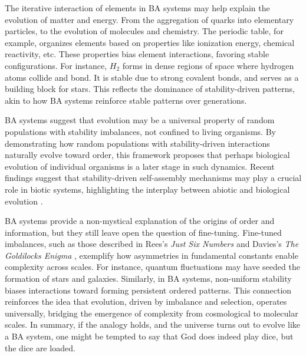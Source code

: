 \documentclass[entropy,article,submit,pdftex,moreauthors]{Definitions/mdpi}
\begin{document}
The iterative interaction of elements in BA systems may help explain the evolution of matter and energy. From the aggregation of quarks into elementary particles, to the evolution of molecules and chemistry. The periodic table, for example, organizes elements based on properties like ionization energy, chemical reactivity, etc. These properties bias element interactions, favoring stable configurations. For instance, \( H_2 \) forms in dense regions of space where hydrogen atoms collide and bond. It is stable due to strong covalent bonds, and serves as a building block for stars. This reflects the dominance of stability-driven patterns, akin to how BA systems reinforce stable patterns over generations. 

BA systems suggest that evolution may be a universal property of random populations with stability imbalances, not confined to living organisms. By demonstrating how random populations with stability-driven interactions naturally evolve toward order, this framework proposes that perhaps biological evolution of individual organisms is a later stage in such dynamics. Recent findings suggest that stability-driven self-assembly mechanisms may play a crucial role in biotic systems, highlighting the interplay between abiotic and biological evolution \cite{davies2022selfassembly}.

BA systems provide a non-mystical explanation of the origins of order and information, but they still leave open the question of fine-tuning. Fine-tuned imbalances, such as those described in Rees's \textit{Just Six Numbers} \cite{rees2000just} and Davies's \textit{The Goldilocks Enigma} \cite{davies2006goldilocks}, exemplify how asymmetries in fundamental constants enable complexity across scales. For instance, quantum fluctuations may have seeded the formation of stars and galaxies. Similarly, in BA systems,  non-uniform stability biases interactions toward forming persistent ordered patterns. This connection reinforces the idea that evolution, driven by imbalance and selection, operates universally, bridging the emergence of complexity from cosmological to molecular scales. In summary, if the analogy holds, and the universe turns out to evolve like a BA system, one might be tempted to say that God does indeed play dice, but the dice are loaded.


\end{document}
